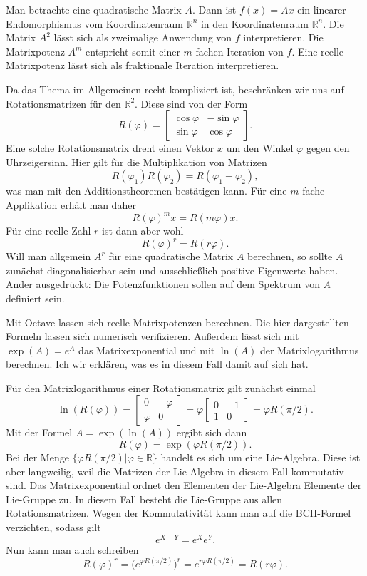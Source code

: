 \documentclass[a4paper,11pt,fleqn]{article}
\begin{document}
Man betrachte eine quadratische Matrix \(A\). Dann ist
\(f(x)=Ax\) ein linearer Endomorphismus vom Koordinatenraum
\(\mathbb R^n\) in den Koordinatenraum \(\mathbb R^n\). Die Matrix
\(A^2\) lässt sich als zweimalige Anwendung von \(f\) interpretieren.
Die Matrixpotenz \(A^m\) entspricht somit einer \(m\)-fachen Iteration
von \(f\). Eine reelle Matrixpotenz lässt sich als fraktionale
Iteration interpretieren.

Da das Thema im Allgemeinen recht kompliziert ist, beschränken wir
uns auf Rotationsmatrizen für den \(\mathbb R^2\). Diese sind von der
Form
\[R(\varphi) = \begin{bmatrix}
\cos\varphi & -\sin\varphi\\
\sin\varphi & \cos\varphi
\end{bmatrix}.\]
Eine solche Rotationsmatrix dreht einen Vektor \(x\) um den
Winkel \(\varphi\) gegen den Uhrzeigersinn. Hier gilt für
die Multiplikation von Matrizen
\[R(\varphi_1)R(\varphi_2) = R(\varphi_1+\varphi_2),\]
was man mit den Additionstheoremen bestätigen kann.
Für eine \(m\)-fache Applikation erhält man daher
\[R(\varphi)^m x = R(m\varphi)x.\]
Für eine reelle Zahl \(r\) ist dann aber wohl
\[R(\varphi)^r = R(r\varphi).\]
Will man allgemein \(A^r\) für eine quadratische Matrix \(A\)
berechnen, so sollte \(A\) zunächst diagonalisierbar sein und
ausschließlich positive Eigenwerte haben. Ander ausgedrückt:
Die Potenzfunktionen sollen auf dem Spektrum von \(A\) definiert
sein.

Mit Octave lassen sich reelle Matrixpotenzen berechnen. Die hier
dargestellten Formeln lassen sich numerisch verifizieren.
Außerdem lässt sich mit \(\exp(A)=e^A\) das Matrixexponential
und mit \(\ln(A)\) der Matrixlogarithmus berechnen.
Ich wir erklären, was es in diesem Fall damit auf sich hat.

Für den Matrixlogarithmus einer Rotationsmatrix gilt zunächst einmal
\[\ln(R(\varphi))
= \begin{bmatrix}
0 & -\varphi\\
\varphi & 0
\end{bmatrix}
= \varphi\begin{bmatrix}
0 & -1\\
1 & 0
\end{bmatrix} = \varphi R(\pi/2).
\]
Mit der Formel \(A=\exp(\ln(A))\) ergibt sich dann
\[R(\varphi) = \exp(\varphi R(\pi/2)).\]
Bei der Menge \(\{\varphi R(\pi/2)|\varphi\in\mathbb R\}\)
handelt es sich um eine Lie-Algebra. Diese ist aber langweilig,
weil die Matrizen der Lie-Algebra in diesem Fall kommutativ sind.
Das Matrixexponential ordnet den Elementen der Lie-Algebra Elemente
der Lie-Gruppe zu. In diesem Fall besteht die Lie-Gruppe aus allen
Rotationsmatrizen. Wegen der Kommutativität kann man auf die
BCH-Formel verzichten, sodass gilt
\[e^{X+Y} = e^X e^Y.\]
Nun kann man auch schreiben
\[R(\varphi)^r = \big(e^{\varphi R(\pi/2)}\big)^r
= e^{r\varphi R(\pi/2)} = R(r\varphi).\]
\end{document}
